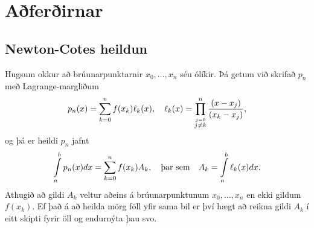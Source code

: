 \documentclass[letterpaper,10pt,icelandic]{sphinxmanual}
\begin{document}

\section{Aðferðirnar}
\label{kafli05:aferirnar}\label{kafli05:index-1}

\subsection{Newton-Cotes heildun}
\label{kafli05:newton-cotes-heildun}
Hugsum okkur að brúunarpunktarnir \(x_0, \ldots, x_n\) séu ólíkir.
Þá getum við skrifað \(p_n\) með Lagrange-margliðum
\begin{gather}
\begin{split}p_n(x) = \sum\limits_{k=0}^n f(x_k) \ell_k(x),
  \quad
  \ell_k(x) = \prod\limits_{\stackrel{j=0}{j \not= k}}^n
  \frac{(x-x_j)}{(x_k-x_j)},\end{split}\notag
\end{gather}
og þá er heildi \(p_n\) jafnt
\begin{gather}
\begin{split}\int\limits_a^b p_n(x) dx =
  \sum\limits_{k=0}^n f(x_k) A_k,
  \quad \text{þar sem} \quad
  A_k = \int\limits_a^b \ell_k(x) dx.\end{split}\notag
\end{gather}
Athugið að gildi \(A_k\) veltur aðeins á brúunarpunktunum
\(x_0, \ldots,
x_n\) en ekki gildum \(f(x_k)\). Ef það á að heilda mörg föll yfir
sama bil er því hægt að reikna gildi \(A_k\) í eitt skipti fyrir öll
og endurnýta þau svo.
\end{document}
